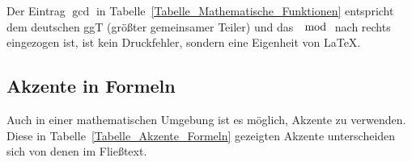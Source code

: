 \documentclass[a4paper,10pt,twoside]{scrbook}
\begin{document}
\begin{table}[h!tb]
\end{table}

Der Eintrag $\gcd$ in Tabelle~\ref{Tabelle_Mathematische_Funktionen} entspricht dem 
deutschen ggT (größter gemeinsamer Teiler) und das $\mod$ nach 
rechts eingezogen ist, ist kein Druckfehler, sondern eine Eigenheit von \LaTeX.


\subsection{Akzente in Formeln}


Auch in einer mathematischen Umgebung ist es 
möglich, Akzente zu verwenden. Diese in Tabelle~\ref{Tabelle_Akzente_Formeln} 
gezeigten Akzente unterscheiden sich von denen im Fließtext.
\end{document}

